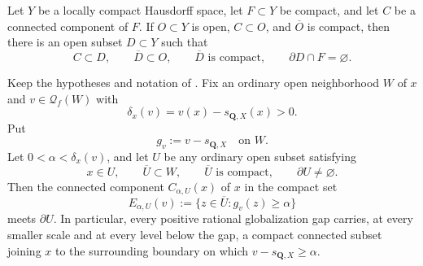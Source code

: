 
\begin{lemma}
\label{lem:p031-compact-component-collar}
Let $Y$ be a locally compact Hausdorff space, let $F\subset Y$ be compact,
and let $C$ be a connected component of $F$.  If $O\subset Y$ is open,
$C\subset O$, and $\overline O$ is compact, then there is an open subset
$D\subset Y$ such that
\begin{equation}
\label{eq:p031-compact-component-collar}
 C\subset D,\qquad \overline D\subset O,\qquad
 \overline D\text{ is compact},\qquad \partial D\cap F=\varnothing.
\end{equation}
\end{lemma}

\begin{theorem}
\label{thm:p031-rational-defect-escape}
Keep the hypotheses and notation of
.  Fix an ordinary open
neighborhood $W$ of $x$ and $v\in\mathcal Q_f(W)$ with
\begin{equation}
\label{eq:p031-rational-defect-escape-positive-gap}
             \delta_x(v)=v(x)-s_{\mathbf Q,X}(x)>0.
\end{equation}
Put
\begin{equation}
\label{eq:p031-rational-defect-profile}
              g_v:=v-s_{\mathbf Q,X}\quad\text{on }W.
\end{equation}
Let $0<\alpha<\delta_x(v)$, and let $U$ be any ordinary open subset
satisfying
\begin{equation}
\label{eq:p031-rational-defect-test-domain}
 x\in U,\qquad \overline U\subset W,\qquad
 \overline U\text{ is compact},\qquad \partial U\ne\varnothing.
\end{equation}
Then the connected component $C_{\alpha,U}(x)$ of $x$ in the compact set
\begin{equation}
\label{eq:p031-rational-defect-superlevel-carrier}
 E_{\alpha,U}(v):=
 \{z\in\overline U:g_v(z)\geq\alpha\}
\end{equation}
meets $\partial U$.  In particular, every positive rational globalization
gap carries, at every smaller scale and at every level below the gap, a
compact connected subset joining $x$ to the surrounding boundary on which
$v-s_{\mathbf Q,X}\geq\alpha$.
\end{theorem}

